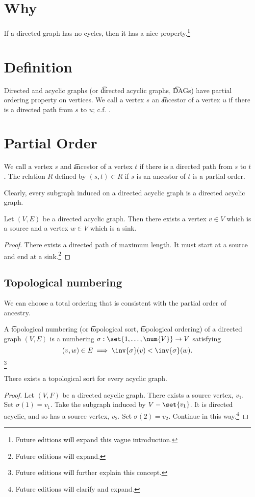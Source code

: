 

\section*{Why}

If a directed graph has no cycles, then it has a nice property.\footnote{Future editions will expand this vague introduction.}

\section*{Definition}

Directed and acyclic graphs (or \t{directed acyclic graphs}, \t{DAGs}) have partial ordering property on vertices.
We call a vertex $s$ an \t{ancestor} of a vertex $u$ if there is a directed path from $s$ to $u$; c.f. .

\section*{Partial Order}

We call a vertex $s$ and \t{ancestor} of a vertex $t$ if there is a directed path from $s$ to $t$.
The relation $R$ defined by $(s, t) \in R$ if $s$ is an ancestor of $t$ is a partial order.

Clearly, every subgraph induced on a directed acyclic graph is a directed acyclic graph.

\begin{proposition}
Let $(V, E)$ be a directed acyclic graph. Then there exists a vertex $v \in V$ which is a source and a vertex $w \in V$ which is a sink.
\begin{proof}There exists a directed path of maximum length. It must start at a source and end at a sink.\footnote{Future editions will expand.}\end{proof}\end{proposition}
\subsection*{Topological numbering}

We can choose a total ordering that is consistent with the partial order of ancestry.

A \t{topological numbering} (or \t{topological sort}, \t{topological ordering}) of a directed graph $(V, E)$ is a numbering $\sigma : \set{1, \dots , \num{V}} \to V$ satisfying
    \[
(v, w) \in E \implies \inv{\sigma }(v) < \inv{\sigma }(w).
    \]\footnote{Future editions will further explain this concept.}

\begin{proposition}
There exists a topological sort for every acyclic graph.\end{proposition}
\begin{proof}Let $(V, F)$ be a directed acyclic graph.
There exists a source vertex, $v_1$.
Set $\sigma (1) = v_1$.
Take the subgraph induced by $V - \set{v_1}$.
It is directed acyclic, and so has a source vertex, $v_2$.
Set $\sigma (2) = v_2$.
Continue in this way.\footnote{Future editions will clarify and expand.}\end{proof}
\blankpage